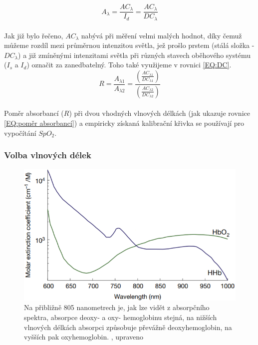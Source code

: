 \begin{equation}
    A_{\lambda} = \frac{AC_{\lambda}}{I_d} = \frac{AC_{\lambda}}{DC_{\lambda}}
    \label{EQ:DC}
\end{equation}\\
Jak již bylo řečeno, $AC_{\lambda}$ nabývá při měření velmi malých hodnot, díky čemuž můžeme rozdíl mezi průměrnou intenzitou světla, jež prošlo prstem (stálá složka - $DC_{\lambda}$) a již zmíněnými intenzitami světla při různých stavech oběhového systému ($I_s$ a $I_d$) označit za zanedbatelný. Toho také využijeme v rovnici \ref{EQ:DC}.\\
\begin{equation}
    R = \frac{A_{\lambda1}}{A_{\lambda2}} = \frac{(\frac{AC_{\lambda1}}{DC_{\lambda1}})}{(\frac{AC_{\lambda2}}{DC_{\lambda2}})}
    \label{EQ:poměr absorbancí}
\end{equation}\\
Poměr absorbancí ($R$) při dvou vhodných vlnových délkách (jak ukazuje rovnice \ref{EQ:poměr absorbancí}) a empiricky získaná kalibrační křivka se používají pro vypočítání $SpO_2$.\\

\subsubsection{Volba vlnových délek}
 
\begin{figure}[H]
  \includegraphics[scale=1, center]{Kapitoly/Teoreticka/Obrazky/Absorpce.png}
  \caption [Absorpční spektrum Hb a Hb$O_2$]{Na přibližně 805 nanometrech je, jak lze vidět z absorpčního spektra, absorpce deoxy- a oxy- hemoglobinu stejná, na nižších vlnových délkách absorpci způsobuje převážně deoxyhemoglobin, na vyšších pak oxyhemoglobin. \citep{KYRIACOU}, upraveno}
  \label{fig:Absorpce}
\end{figure}

